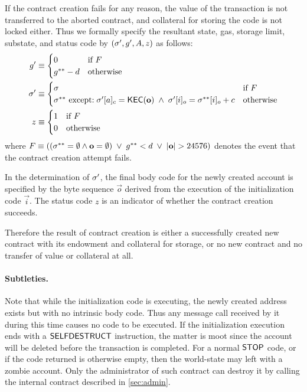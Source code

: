 If the contract creation fails for any reason, the value of the transaction is not transferred to the aborted contract, and collateral for storing the code is not locked either.
Thus we formally specify the resultant state, gas, storage limit, substate, and status code by $\left(\mathbf{\sigma}', g', A, z\right)$ as follows:
\begin{align}
	g' &\equiv \begin{cases}
		0 & \mbox{if $F$}\\
		g^{**}-d & \mbox{otherwise}
	\end{cases} \\
	\mathbf{\sigma}' &\equiv 
	\begin{cases}
		\mathbf{\sigma} 	 	& \mbox{if $F$}\\
		\mathbf{\sigma}^{**} 	\mbox{ except:} 
		\; \mathbf{\sigma}'[a]_c = \mathsf{KEC}(\mathbf{o})\;\land\; \mathbf{\sigma}'[i]_o=\mathbf{\sigma}^{**}[i]_o+c& \mbox{otherwise}
	\end{cases}\\
	z &\equiv 
	\begin{cases}
		1	 	& \mbox{if $F$}\\
		0	 	& \mbox{otherwise}
	\end{cases}
\end{align}
where $F\eqdef\left( \left(\st^{**}=\emptyset \land \vec{o}=\emptyset \right)\;\lor\; g^{**}<d \;\lor\;|{\bf o}|>24576 \right)$
denotes the event that the contract creation attempt fails.

In the determination of $\mathbf{\sigma}'$, the final body code for the newly created account is specified by the byte sequence $\vec{o}$ derived from the execution of the initialization code $\vec{i}$.
The status code $z$ is an indicator of whether the contract creation succeeds.

Therefore the result of contract creation is either a successfully created new contract with its endowment and collateral for storage, or no new contract and no transfer of value or collateral at all.

\paragraph{Subtleties.} 
Note that while the initialization code is executing, the newly created address exists but with no intrinsic body code. 
Thus any message call received by it during this time causes no code to be executed. 
If the initialization execution ends with a $\mathsf{SELFDESTRUCT}$ instruction, the matter is moot since the account will be deleted before the transaction is completed. 
For a normal $\mathsf{STOP}$ code, or if the code returned is otherwise empty, then the world-state may left with a zombie account. Only the administrator of such contract can destroy it by calling the internal contract described in \cref{sec:admin}.



